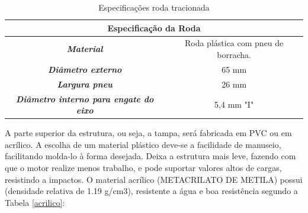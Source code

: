 			\begin{table}[H]
				\centering
				\caption{Especificações roda tracionada}
				\label{tab:especificacoes_roda}
				\begin{tabular}{|c|c|}
					\hline
					\multicolumn{2}{|c|}{\cellcolor[HTML]{C0C0C0}\textbf{Especificação da Roda}}                 \\ \hline
					\textit{\textbf{Material}}                             & Roda plástica com pneu de borracha. \\ \hline
					\textit{\textbf{Diâmetro externo}}                     & 65 mm                               \\ \hline
					\textit{\textbf{Largura pneu}}                         & 26 mm                               \\ \hline
					\textit{\textbf{Diâmetro interno para engate do eixo}} & 5,4 mm "I"                          \\ \hline
				\end{tabular}
			\end{table}

			A parte superior da estrutura, ou seja, a tampa, será fabricada em PVC ou em acrílico. A escolha de um material plástico deve-se a facilidade de manuseio, facilitando molda-lo à forma desejada. Deixa a estrutura mais leve, fazendo com que o motor realize menos trabalho, e pode suportar valores altos de cargas, resistindo a impactos. O material acrílico (METACRILATO DE METILA) possui (densidade relativa de 1.19 g/cm3), resistente a água e boa resistência segundo a Tabela \ref{acrilico}:
						
